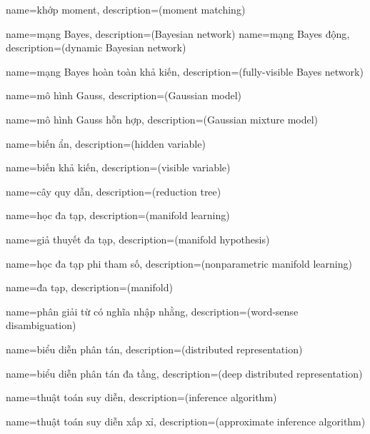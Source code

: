 {
    name={khớp moment},
    description={(moment matching)}
}

{
    name={mạng Bayes},
    description={(Bayesian network)}
}
{
    name={mạng Bayes động},
    description={(dynamic Bayesian network)}
}

{
    name={mạng Bayes hoàn toàn khả kiến},
    description={(fully-visible Bayes network)}
}

{
    name={mô hình Gauss},
    description={(Gaussian model)}
}

{
    name={mô hình Gauss hỗn hợp},
    description={(Gaussian mixture model)}
}

{
    name={biến ẩn},
    description={(hidden variable)}
}

{
    name={biến khả kiến},
    description={(visible variable)}
}

{
    name={cây quy dẫn},
    description={(reduction tree)}
}

{
    name={học đa tạp},
    description={(manifold learning)}
}

{
    name={giả thuyết đa tạp},
    description={(manifold hypothesis)}
}

{
    name={học đa tạp phi tham số},
    description={(nonparametric manifold learning)}
}

{
    name={đa tạp},
    description={(manifold)}
}

{
    name={phân giải từ có nghĩa nhập nhằng},
    description={(word-sense disambiguation)}
}

{
    name={biểu diễn phân tán},
    description={(distributed representation)}
}

{
    name={biểu diễn phân tán đa tầng},
    description={(deep distributed representation)}
}

{
    name={thuật toán suy diễn},
    description={(inference algorithm)}
}

{
    name={thuật toán suy diễn xấp xỉ},
    description={(approximate inference algorithm)}
}

